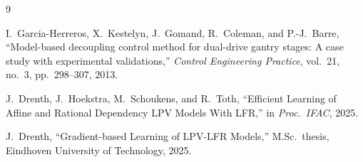 \documentclass[11pt]{article}
\begin{document}
\newpage
\begin{thebibliography}{9}

I.~Garcia-Herreros, X.~Kestelyn, J.~Gomand, R.~Coleman, and P.-J.~Barre,
``Model-based decoupling control method for dual-drive gantry stages:
A case study with experimental validations,''
\textit{Control Engineering Practice}, vol.~21, no.~3, pp.~298--307, 2013.

J.~Drenth, J.~Hoekstra, M.~Schoukens, and R.~Toth,
``Efficient Learning of Affine and Rational Dependency LPV Models With LFR,''
in \textit{Proc.\ IFAC}, 2025.

J.~Drenth,
``Gradient-based Learning of LPV-LFR Models,''
M.Sc.\ thesis, Eindhoven University of Technology, 2025.

\end{thebibliography}
\end{document}
